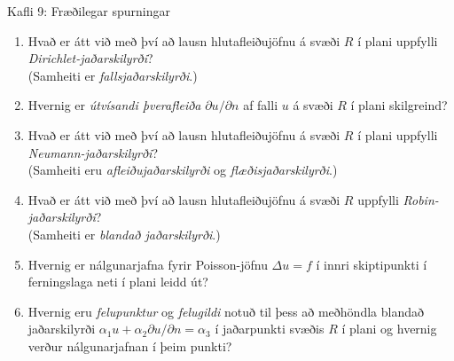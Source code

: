 \begin{frame}{Kafli 9: Fræðilegar spurningar}
\begin{enumerate}
  \item Hvað er átt við með því að lausn hlutafleiðujöfnu á svæði  $R$
    í plani 
    uppfylli {\it Dirichlet-jaðarskilyrði}?  \\
(Samheiti er {\it fallsjaðarskilyrði}.)
\item Hvernig er {\it útvísandi þverafleiða} $\partial u/\partial n$ af 
falli $u$ á svæði $R$ í plani skilgreind?  
\item Hvað er átt við með því að lausn hlutafleiðujöfnu á svæði $R$ í plani
    uppfylli {\it Neumann-jaðarskilyrði}? \\ (Samheiti eru {\it
      afleiðujaðarskilyrði}
og {\it flæðisjaðarskilyrði}.)
  \item Hvað er átt við með því að lausn hlutafleiðujöfnu á svæði  $R$
    uppfylli {\it Robin-jaðarskilyrði}?  \\ 
(Samheiti er {\it blandað jaðarskilyrði}.)
  \item Hvernig er  nálgunarjafna fyrir 
Poisson-jöfnu $\Delta u=f$ í innri skiptipunkti
í ferningslaga neti í plani leidd út? 
  \item Hvernig eru {\it felupunktur}  og {\it felugildi} notuð til
    þess að meðhöndla blandað jaðarskilyrði $\alpha_1 u+\alpha_2
    \partial u/\partial n=\alpha_3$ í jaðarpunkti svæðis $R$ í plani
    og hvernig verður nálgunarjafnan í þeim punkti? 
  \end{enumerate}
\end{frame}


